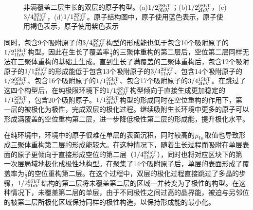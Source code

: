 \begin{figure}[htb]
{        \label{fig:IS_structure_partical_3-4_0-3}
    }
    \caption{非满覆盖二层生长的双层的原子构型。(a)$\rm 1/2{}_{0InV}^{2SbT} \it$；(b)$\rm 1/2{}_{2InV}^{0SbT} \it$，(c)$\rm 3/4{}_{0InV}^{3SbT} \it$，(d)$\rm 1/1{}_{1InV}^{2SbT} \it$。原子结构图中，原子使用蓝色表示，原子使用褐色表示，原子使用紫色表示}
    \label{fig:IS_structure_partical_1}
\end{figure}

同时，包含9个吸附原子的$\rm 3/4{}_{0InV}^{3SbT} \it$构型的形成能也低于包含10个吸附原子的$\rm 1/2{}_{1InV}^{1SbT} \it$构型。因此在生长了覆盖率$\frac{1}{3}$的三聚体重构的第二层后，空位第二层同样无法在三聚体重构的基础上生成。直到生长了满覆盖的三聚体重构后，包含12个吸附原子的$\rm 1/1{}_{0InV}^{4SbT} \it$的形成能低于包含13个吸附原子的$\rm 3/4{}_{1InV}^{2SbT} \it$、包含14个吸附原子的$\rm 1/2{}_{2InV}^{0SbT} \it$、包含16个吸附原子的$\rm 1/1{}_{1InV}^{3SbT} \it$、包含17个吸附原子的$\rm 3/4{}_{2InV}^{1SbT} \it$。在跳过了这四个构型后，在纯极限环境下的$\rm 1/1{}_{0InV}^{4SbT} \it$构型倾向于直接生成更加稳定的$\rm 1/1{}_{2InV}^{2SbT} \it$，包含20个吸附原子。$\rm 1/1{}_{2InV}^{2SbT} \it$构型的形成同时在空位重构的作用下，第一层的被极化为极性，完成双层的极化过程。继续吸附生长环境中更多的原子可以形成满覆盖的空位重构第二层，进一步降低极性第二层的形成能，提升极化水平。

在纯环境中，环境中的原子很难在单层的表面沉积，同时较高的$\it \mu_{\rm In}^{\rm } \it$取值也导致形成三聚体重构第二层的形成能较大。在这种情况下，随着生长过程而吸附在单层表面的原子更倾向于直接形成空位的第二层（$\rm 1/4{}_{1InV}^{0SbT} \it$），同时也将对应区块下的第一次层局域地极化成极性地构型。在聚集了14个吸附原子后，单层的表面形成了覆盖率为$\frac{1}{2}$的空位重构第二层。在这个过程中，双层的极化过程直接跳过了多晶的步骤，$\rm 1/2{}_{2InV}^{0SbT} \it$结构的第二层将未覆盖第二层的区域一并转变为了极性的构型。在这种情况下，未覆盖第二层的单层，由于不同极性之间过高的晶界能，被迫与另邻位的被第二层所极化区域保持同样的极性构造，以保持形成能的最小化。

